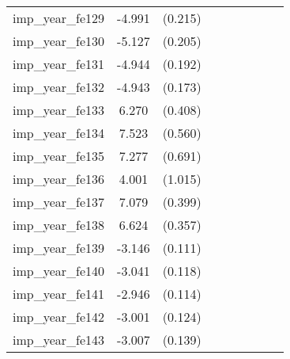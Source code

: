 {\begin{tabular}{l*{4}{cc}}
imp\_year\_fe129&   -4.991\sym{***}&  (0.215)&                  &         &                  &         &                  &         \\
imp\_year\_fe130&   -5.127\sym{***}&  (0.205)&                  &         &                  &         &                  &         \\
imp\_year\_fe131&   -4.944\sym{***}&  (0.192)&                  &         &                  &         &                  &         \\
imp\_year\_fe132&   -4.943\sym{***}&  (0.173)&                  &         &                  &         &                  &         \\
imp\_year\_fe133&    6.270\sym{***}&  (0.408)&                  &         &                  &         &                  &         \\
imp\_year\_fe134&    7.523\sym{***}&  (0.560)&                  &         &                  &         &                  &         \\
imp\_year\_fe135&    7.277\sym{***}&  (0.691)&                  &         &                  &         &                  &         \\
imp\_year\_fe136&    4.001\sym{***}&  (1.015)&                  &         &                  &         &                  &         \\
imp\_year\_fe137&    7.079\sym{***}&  (0.399)&                  &         &                  &         &                  &         \\
imp\_year\_fe138&    6.624\sym{***}&  (0.357)&                  &         &                  &         &                  &         \\
imp\_year\_fe139&   -3.146\sym{***}&  (0.111)&                  &         &                  &         &                  &         \\
imp\_year\_fe140&   -3.041\sym{***}&  (0.118)&                  &         &                  &         &                  &         \\
imp\_year\_fe141&   -2.946\sym{***}&  (0.114)&                  &         &                  &         &                  &         \\
imp\_year\_fe142&   -3.001\sym{***}&  (0.124)&                  &         &                  &         &                  &         \\
imp\_year\_fe143&   -3.007\sym{***}&  (0.139)&                  &         &                  &         &                  &         \\

\end{tabular}}

